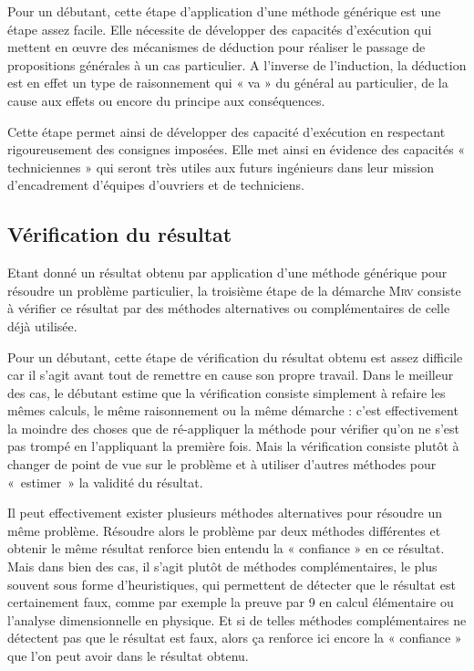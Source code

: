 Pour un débutant, cette étape d'application d'une méthode générique est une étape 
assez facile. Elle nécessite de développer des capacités d'exécution
qui mettent en \oe uvre des mécanismes de déduction pour réaliser le passage
de propositions générales à un cas particulier.
A l'inverse de l'induction, la déduction est en effet un type de raisonnement
qui « va » du général au particulier, de la cause aux effets ou encore du principe aux
conséquences.

Cette étape permet ainsi de développer des capacité d'exécution en respectant
rigoureusement des consignes imposées. Elle met ainsi en évidence des capacités 
« techniciennes » qui seront très utiles aux futurs ingénieurs dans leur mission 
d'encadrement d'équipes d'ouvriers et de techniciens.


\subsection{Vérification du résultat}\label{subsec:verification}
Etant donné un résultat obtenu par application d'une méthode générique pour résoudre un problème particulier, la troisième étape de la démarche \textsc{Mrv} consiste à vérifier ce résultat
par des méthodes alternatives ou complémentaires de celle déjà utilisée.

Pour un débutant, cette étape de vérification du résultat obtenu est assez difficile
car il s'agit avant tout de remettre en cause son propre travail. 
Dans le meilleur des cas, le débutant estime que la vérification consiste simplement 
à refaire les mêmes calculs, le même raisonnement ou la même démarche : 
c'est effectivement la moindre des choses que de ré-appliquer la méthode pour vérifier 
qu'on ne s'est pas trompé en l'appliquant la première fois. 
Mais la vérification consiste plutôt à changer de point de vue sur le problème
et à utiliser d'autres méthodes pour «~estimer~» la validité du résultat.

Il peut effectivement exister plusieurs méthodes alternatives pour résoudre un même
problème. Résoudre alors le problème par deux méthodes différentes et obtenir le 
même résultat renforce bien entendu la « confiance » en ce résultat.
Mais dans bien des cas, il s'agit plutôt de méthodes complémentaires, le plus souvent 
sous forme d'heuristiques, qui permettent de détecter que le résultat est 
certainement faux, comme par exemple la preuve par 9 en calcul élémentaire ou
l'analyse dimensionnelle en physique. Et si de telles méthodes complémentaires ne détectent pas que le 
résultat est faux, alors ça renforce ici encore la « confiance » que l'on peut
avoir dans le résultat obtenu.

